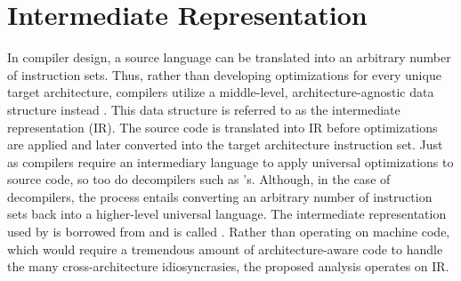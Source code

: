 \section{Intermediate Representation}
In compiler design, a source language can be translated into an arbitrary number of instruction sets. Thus, rather than developing optimizations for every unique target architecture, compilers utilize a middle-level, architecture-agnostic data structure instead \citep{grune2012modern, muchnick1997advanced, aho2003compilers}. This data structure is referred to as the intermediate representation (IR). The source code is translated into IR before optimizations are applied and later converted into the target architecture instruction set. Just as compilers require an intermediary language to apply universal optimizations to source code, so too do decompilers such as ’s. Although, in the case of decompilers, the process entails converting an arbitrary number of instruction sets back into a higher-level universal language. The intermediate representation used by  is borrowed from  and is called  \citep{vexir}. Rather than operating on machine code, which would require a tremendous amount of architecture-aware code to handle the many cross-architecture idiosyncrasies, the proposed analysis operates on  IR.